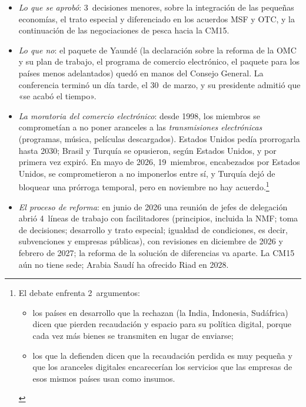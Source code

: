 \documentclass[11pt]{article}
\begin{document}
\begin{itemize}
\item \emph{Lo que se aprobó}: 3~decisiones menores, sobre la integración de las pequeñas economías, el trato especial y diferenciado en los acuerdos MSF y OTC, y la continuación de las negociaciones de pesca hacia la CM15\nocite{OMC2026CG0605}.
\item \emph{Lo que no}: el paquete de Yaundé (la declaración sobre la reforma de la OMC y su plan de trabajo, el programa de comercio electrónico, el paquete para los países menos adelantados) quedó en manos del Consejo General. La conferencia terminó un día tarde, el 30~de marzo, y su presidente admitió que «se acabó el tiempo»\nocite{OMC2026CM14}.
\item \emph{La moratoria del comercio electrónico}: desde 1998, los miembros se comprometían a no poner aranceles a las \emph{transmisiones electrónicas} (programas, música, películas descargados). Estados Unidos pedía prorrogarla hasta 2030; Brasil y Turquía se opusieron, según Estados Unidos, y por primera vez expiró\nocite{USTR2026CM14}. En mayo de 2026, 19~miembros, encabezados por Estados Unidos, se comprometieron a no imponerlos entre sí, y Turquía dejó de bloquear una prórroga temporal, pero en noviembre no hay acuerdo\nocite{OMC2026CG0605,OMC2026CG1005}.\footnote{El debate enfrenta 2~argumentos:
\begin{itemize}
\item los países en desarrollo que la rechazan (la India, Indonesia, Sudáfrica) dicen que pierden recaudación y espacio para su política digital, porque cada vez más bienes se transmiten en lugar de enviarse;
\item los que la defienden dicen que la recaudación perdida es muy pequeña y que los aranceles digitales encarecerían los servicios que las empresas de esos mismos países usan como insumos.
\end{itemize}}
\item \emph{El proceso de reforma}: en junio de 2026 una reunión de jefes de delegación abrió 4~líneas de trabajo con facilitadores (principios, incluida la NMF; toma de decisiones; desarrollo y trato especial; igualdad de condiciones, es decir, subvenciones y empresas públicas), con revisiones en diciembre de 2026 y febrero de 2027; la reforma de la solución de diferencias va aparte\nocite{OMC2026Reforma}. La CM15 aún no tiene sede; Arabia Saudí ha ofrecido Riad en 2028.
\end{itemize}

\end{document}
